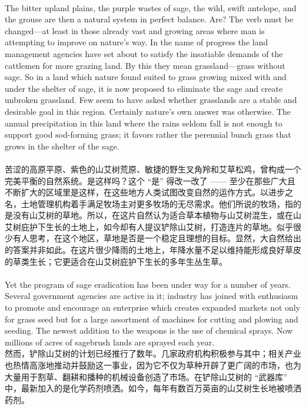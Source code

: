 \documentclass{article}
\begin{document}
\\
The bitter upland plains, the purple wastes of sage, the wild, swift antelope, and the grouse are then a natural system in perfect balance. Are? The verb must be changed—at least in those already vast and growing areas where man is attempting to improve on nature’s way. In the name of progress the land management agencies have set about to satisfy the insatiable demands of the cattlemen for more grazing land. By this they mean grassland—grass without sage. So in a land which nature found suited to grass growing mixed with and under the shelter of sage, it is now proposed to eliminate the sage and create unbroken grassland. Few seem to have asked whether grasslands are a stable and desirable goal in this region. Certainly nature’s own answer was otherwise. The annual precipitation in this land where the rains seldom fall is not enough to support good sod-forming grass; it favors rather the perennial bunch grass that grows in the shelter of the sage.\\\\
苦涩的高原平原、紫色的山艾树荒原、敏捷的野生叉角羚和艾草松鸡，曾构成一个完美平衡的自然系统。是这样吗？这个 “是” 得改一改了 —— 至少在那些广大且不断扩大的区域里是这样，在这些地方人类试图改变自然的运作方式。以进步之名，土地管理机构着手满足牧场主对更多牧场的无尽需求。他们所说的牧场，指的是没有山艾树的草地。所以，在这片自然认为适合草本植物与山艾树混生，或在山艾树庇护下生长的土地上，如今却有人提议铲除山艾树，打造连片的草地。似乎很少有人思考，在这个地区，草地是否是一个稳定且理想的目标。显然，大自然给出的答案并非如此。在这片很少降雨的土地上，年降水量不足以维持能形成良好草皮的草类生长；它更适合在山艾树庇护下生长的多年生丛生草。\\

\\
Yet the program of sage eradication has been under way for a number of years. Several government agencies are active in it; industry has joined with enthusiasm to promote and encourage an enterprise which creates expanded markets not only for grass seed but for a large assortment of machines for cutting and plowing and seeding. The newest addition to the weapons is the use of chemical sprays. Now millions of acres of sagebrush lands are sprayed each year.\\
然而，铲除山艾树的计划已经推行了数年。几家政府机构积极参与其中；相关产业也热情高涨地推动并鼓励这一事业，因为它不仅为草种开辟了更广阔的市场，也为大量用于割草、翻耕和播种的机械设备创造了市场。在铲除山艾树的 “武器库” 中，最新加入的是化学药剂喷洒。如今，每年有数百万英亩的山艾树生长地被喷洒药剂。 \\
\end{document}

